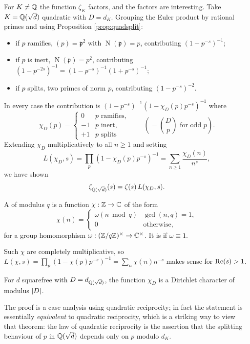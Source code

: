 \documentclass[a4paper]{scrartcl}
\newcommand{\Nm}{\operatorname{N}}
\newcommand{\fp}{\mathfrak{p}}
\newcommand{\legendre}[2]{\left( \frac{#1}{#2} \right)}
\begin{document}
For $K \neq \mathbb{Q}$ the function $\zeta_K$ factors, and the factors are interesting. Take $K = \mathbb{Q}(\sqrt d)$ quadratic with $D = d_K$. Grouping the Euler product by rational primes and using Proposition \ref{prop:quadsplit}:
\begin{itemize}
	\item if $p$ ramifies, $(p)=\fp^2$ with $\Nm(\fp) = p$, contributing $\left(1-p^{-s}\right)^{-1}$;
	\item if $p$ is inert, $\Nm(\fp)=p^2$, contributing $\left(1-p^{-2s}\right)^{-1} = \left(1-p^{-s}\right)^{-1}\left(1+p^{-s}\right)^{-1}$;
	\item if $p$ splits, two primes of norm $p$, contributing $\left(1-p^{-s}\right)^{-2}$.
\end{itemize}
In every case the contribution is $\left(1-p^{-s}\right)^{-1}\left(1-\chi_D(p)p^{-s}\right)^{-1}$ where
$$\chi_D(p) = \begin{cases}0 & p \text{ ramifies},\\ -1 & p \text{ inert},\\ +1 & p \text{ splits}\end{cases} \qquad\left( = \legendre{D}{p} \text{ for odd } p\right).$$
Extending $\chi_D$ multiplicatively to all $n \geq 1$ and setting
$$L(\chi_D,s) = \prod_p\left(1-\chi_D(p)p^{-s}\right)^{-1} = \sum_{n\ge1}\frac{\chi_D(n)}{n^s},$$
we have shown
$$\zeta_{\mathbb{Q}(\sqrt d)}(s) = \zeta(s)\,L(\chi_D,s).$$

\begin{definition}
	A  of modulus $q$ is a function $\chi : \mathbb{Z} \to \mathbb{C}$ of the form
	$$\chi(n) = \begin{cases}\omega(n \bmod q) & \gcd(n,q)=1,\\ 0 & \text{otherwise},\end{cases}$$
	for a group homomorphism $\omega : (\mathbb{Z}/q\mathbb{Z})^\times \to \mathbb{C}^\times$. It is  if $\omega \equiv 1$.
\end{definition}

Such $\chi$ are completely multiplicative, so $L(\chi,s) = \prod_p(1-\chi(p)p^{-s})^{-1} = \sum_n\chi(n)n^{-s}$ makes sense for $\operatorname{Re}(s)>1$.

\begin{theorem}
	For $d$ squarefree with $D = d_{\mathbb{Q}(\sqrt d)}$, the function $\chi_D$ is a Dirichlet character of modulus $\lvert D\rvert$.
\end{theorem}

The proof is a case analysis using quadratic reciprocity; in fact the statement is essentially \emph{equivalent} to quadratic reciprocity, which is a striking way to view that theorem: the law of quadratic reciprocity is the assertion that the splitting behaviour of $p$ in $\mathbb{Q}(\sqrt d)$ depends only on $p$ modulo $d_K$.
\end{document}
